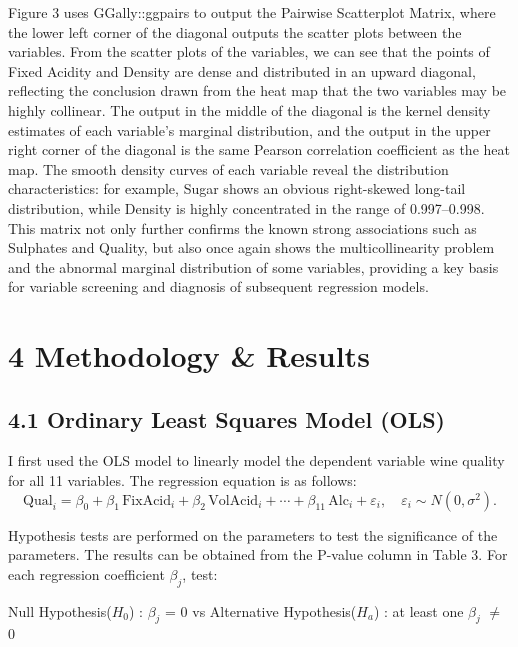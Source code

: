 \documentclass[
  doc,floatsintext]{apa6}
\begin{document}
Figure 3 uses GGally::ggpairs to output the Pairwise Scatterplot Matrix, where the lower left corner of the diagonal outputs the scatter plots between the variables. From the scatter plots of the variables, we can see that the points of Fixed Acidity and Density are dense and distributed in an upward diagonal, reflecting the conclusion drawn from the heat map that the two variables may be highly collinear. The output in the middle of the diagonal is the kernel density estimates of each variable's marginal distribution, and the output in the upper right corner of the diagonal is the same Pearson correlation coefficient as the heat map. The smooth density curves of each variable reveal the distribution characteristics: for example, Sugar shows an obvious right-skewed long-tail distribution, while Density is highly concentrated in the range of 0.997--0.998. This matrix not only further confirms the known strong associations such as Sulphates and Quality, but also once again shows the multicollinearity problem and the abnormal marginal distribution of some variables, providing a key basis for variable screening and diagnosis of subsequent regression models.

\newpage

\section{4 Methodology \& Results}\label{methodology-results}

\subsection{4.1 Ordinary Least Squares Model (OLS)}\label{ordinary-least-squares-model-ols}

I first used the OLS model to linearly model the dependent variable wine quality for all 11 variables. The regression equation is as follows:
\begin{equation}
\label{eq:ols}
\mathrm{Qual}_i
= \beta_0
+ \beta_1\,\mathrm{FixAcid}_i
+ \beta_2\,\mathrm{VolAcid}_i
+ \cdots
+ \beta_{11}\,\mathrm{Alc}_i
+ \varepsilon_i,
\quad
\varepsilon_i \sim N(0,\sigma^2).
\end{equation}

Hypothesis tests are performed on the parameters to test the significance of the parameters. The results can be obtained from the P-value column in Table 3. For each regression coefficient \(\beta_j\), test:

Null Hypothesis(\(H_0\)) : \(\beta_j\) = 0 vs Alternative Hypothesis(\(H_a\)) : at least one \(\beta_j\) \(≠\) 0
\end{document}
